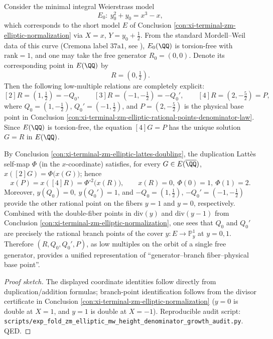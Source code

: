 ﻿%

\begin{conclusion}\label{con:xi-terminal-zm-elliptic-mw-generator-alignment}
Consider the minimal integral Weierstrass model
\[
E_0:\ y_0^2+y_0=x^3-x,
\]
which corresponds to the short model \(E\) of Conclusion \ref{con:xi-terminal-zm-elliptic-normalization} via \(X=x\), \(Y=y_0+\tfrac12\).
From the standard Mordell--Weil data of this curve (Cremona label \(37\mathrm{a}1\), see \cite{LMFDBEllipticCurve37a1}),
\(E_0(\QQ)\) is torsion-free with \(\mathrm{rank}=1\), and one may take the free generator \(R_0=(0,0)\).
Denote its corresponding point in \(E(\QQ)\) by
\[
R=(0,\tfrac12).
\]
Then the following low-multiple relations are completely explicit:
\[
[2]R=\left(1,\tfrac12\right)=-Q_0,\qquad
[3]R=\left(-1,-\tfrac12\right)=-Q_0',\qquad
[4]R=\left(2,-\tfrac52\right)=P,
\]
where \(Q_0=(1,-\tfrac12)\), \(Q_0'=(-1,\tfrac12)\), and \(P=(2,-\tfrac52)\) is the physical base point in Conclusion \ref{con:xi-terminal-zm-elliptic-rational-points-denominator-law}.
Since \(E(\QQ)\) is torsion-free, the equation \([4]G=P\) has the unique solution \(G=R\) in \(E(\QQ)\).
\par
By Conclusion \ref{con:xi-terminal-zm-elliptic-lattes-doubling}, the duplication Latt\`es self-map \(\Phi\) (in the \(x\)-coordinate) satisfies, for every \(G\in E(\overline{\QQ})\),
\(
x([2]G)=\Phi\bigl(x(G)\bigr)
\);
hence
\[
x(P)=x([4]R)=\Phi^{\circ 2}\!\bigl(x(R)\bigr),
\qquad
x(R)=0,\ \Phi(0)=1,\ \Phi(1)=2.
\]
Moreover,
\(
y(Q_0)=0,\ y(Q_0')=1
\),
and \(-Q_0=(1,\tfrac12)\), \(-Q_0'=(-1,-\tfrac12)\) provide the other rational point on the fibers \(y=1\) and \(y=0\), respectively.
Combined with the double-fiber points in \(\mathrm{div}(y)\) and \(\mathrm{div}(y-1)\) from Conclusion \ref{con:xi-terminal-zm-elliptic-normalization}, one sees that
\(Q_0\) and \(Q_0'\) are precisely the rational branch points of the cover \(y:E\to\mathbb P^1_y\) at \(y=0,1\).
Therefore \((R,Q_0,Q_0',P)\), as low multiples on the orbit of a single free generator, provides a unified representation of ``generator--branch fiber--physical base point''.
\end{conclusion}
\begin{proof}[Proof sketch]
The displayed coordinate identities follow directly from duplication/addition formulas; branch-point identification follows from the divisor certificate in Conclusion \ref{con:xi-terminal-zm-elliptic-normalization} (\(y=0\) is double at \(X=1\), and \(y=1\) is double at \(X=-1\)).
Reproducible audit script: \texttt{scripts/exp\_fold\_zm\_elliptic\_mw\_height\_denominator\_growth\_audit.py}. QED.
\end{proof}

